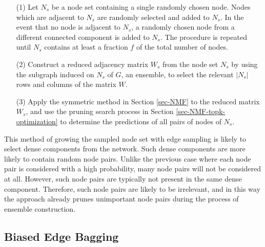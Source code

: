 \begin{enumerate}
\item[(1)]Let $N_s$ be a node set containing a single randomly chosen
node. Nodes which are adjacent to $N_s$ are randomly selected and
added to $N_s$. In the event that no node is adjacent to $N_s$, a
randomly chosen node from a different connected component is added
to $N_s$. The procedure is repeated until $N_s$ contains at least a
fraction $f$ of the total number of nodes.

\item[(2)]  Construct a reduced
adjacency matrix $W_s$ from the node set $N_s$ by using the subgraph
induced on $N_s$ of $G$, \ie an ensemble, to select the relevant $|N_s|$ rows and columns of the matrix $W$.

\item[(3)] Apply the symmetric \NMF method in Section \ref{sec-NMF}
to the reduced matrix $W_s$, and use the pruning search process in Section \ref{sec-NMF-topk-optimization} to determine the predictions of all pairs of nodes  of $N_s$.
\end{enumerate}


This method of growing the sampled node set with edge sampling is
likely to select dense components from the network. Such dense
components are more likely to contain random node pairs. Unlike the
previous case where each node pair is considered with a high
probability, many node pairs will not be considered at all. However,
such node pairs are typically not present in the same dense
component. Therefore, such node pairs are likely to be irrelevant,
and in this way the approach already prunes unimportant node pairs
during the process of ensemble construction.



\subsection{Biased Edge Bagging}

